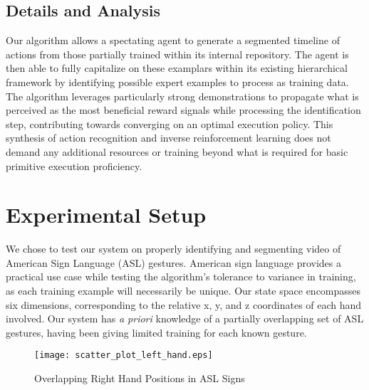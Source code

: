\documentclass[letterpaper]{article}
\begin{document}
\subsection{Details and Analysis}
\label{sec:recognition_analysis}
Our algorithm allows a spectating agent to generate a segmented timeline of actions from those partially trained within its internal repository. The agent is then able to fully capitalize on these examplars within its existing hierarchical framework by identifying possible expert examples to process as training data. The algorithm leverages particularly strong demonstrations to propagate what is perceived as the most beneficial reward signals while processing the identification step, contributing towards converging on an optimal execution policy. This synthesis of action recognition and inverse reinforcement learning does not demand any additional resources or training beyond what is required for basic primitive execution proficiency.


\section{Experimental Setup}
\label{sec:experiment}
We chose to test our system on properly identifying and segmenting video of American Sign Language (ASL) gestures. American sign language provides a practical use case while testing the algorithm's tolerance to variance in training, as each training example will necessarily be unique. Our state space encompasses six dimensions, corresponding to the relative x, y, and z coordinates of each hand involved.  Our system has \textit{a priori} knowledge of a partially overlapping set of ASL gestures, having been giving limited training for each known gesture.

\begin{figure}
\begin{center}
\texttt{[image: scatter\_plot\_left\_hand.eps]}
\caption{Overlapping Right Hand Positions in ASL Signs}
\label{fig:asl_sign_overlap}
\end{center}
\end{figure}
\end{document}
